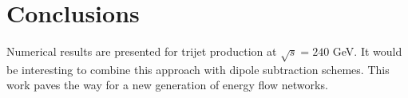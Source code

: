 \section{Conclusions}\label{sec:conclusions}

Numerical results are presented for trijet production at $\sqrt{s} =
240$ GeV. It would be interesting to combine this approach with dipole
subtraction schemes. This work paves the way for a new generation of
energy flow networks.

